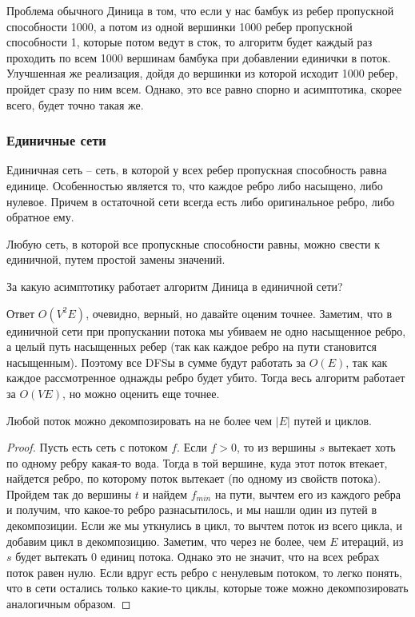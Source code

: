 \noindent Проблема обычного Диница в том, что если у нас бамбук из ребер пропускной способности 1000, а потом из одной вершинки 1000 ребер пропускной способности 1, которые потом ведут в сток, то алгоритм будет каждый раз проходить по всем 1000 вершинам бамбука при добавлении единички в поток. Улучшенная же реализация, дойдя до вершинки из которой исходит 1000 ребер, пройдет сразу по ним всем. Однако, это все равно спорно и асимптотика, скорее всего, будет точно такая же.

\subsubsection{Единичные сети}

\begin{definition}
    Единичная сеть -- сеть, в которой у всех ребер пропускная способность равна единице. Особенностью является то, что каждое ребро либо насыщено, либо нулевое. Причем в остаточной сети всегда есть либо оригинальное ребро, либо обратное ему.
\end{definition}

\begin{note}
    Любую сеть, в которой все пропускные способности равны, можно свести к единичной, путем простой замены значений.
\end{note}

\begin{problem}
    За какую асимптотику работает алгоритм Диница в единичной сети?
\end{problem}

\begin{solution}
    Ответ $O(V^2E)$, очевидно, верный, но давайте оценим точнее. Заметим, что в единичной сети при пропускании потока мы убиваем не одно насыщенное ребро, а целый путь насыщенных ребер (так как каждое ребро на пути становится насыщенным). Поэтому все DFSы в сумме будут работать за $O(E)$, так как каждое рассмотренное однажды ребро будет убито. Тогда весь алгоритм работает за $O(VE)$, но можно оценить еще точнее.
\end{solution}

\begin{theorem}
    Любой поток можно декомпозировать на не более чем $|E|$ путей и циклов.
\end{theorem}

\begin{proof}
    Пусть есть сеть с потоком $f$. Если $f > 0$, то из вершины $s$ вытекает хоть по одному ребру какая-то вода. Тогда в той вершине, куда этот поток втекает, найдется ребро, по которому поток вытекает (по одному из свойств потока). Пройдем так до вершины $t$ и найдем $f_{min}$ на пути, вычтем его из каждого ребра и получим, что какое-то ребро разнасытилось, и мы нашли один из путей в декомпозиции. Если же мы уткнулись в цикл, то вычтем поток из всего цикла, и добавим цикл в декомпозицию. Заметим, что через не более, чем $E$ итераций, из $s$ будет вытекать 0 единиц потока. Однако это не значит, что на всех ребрах поток равен нулю. Если вдруг есть ребро с ненулевым потоком, то легко понять, что в сети остались только какие-то циклы, которые тоже можно декомпозировать аналогичным образом.
\end{proof}

